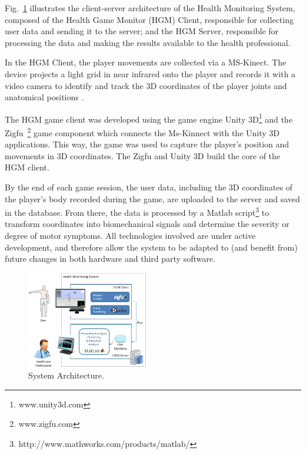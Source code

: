 \documentclass[10pt, conference, compsocconf]{IEEEtran}
\begin{document}

Fig.~\ref{img:sysarch} illustrates the client-server architecture of the Health Monitoring System, composed of the Health Game Monitor (HGM) Client, responsible for collecting user data and sending it to the server; and the HGM Server, responsible for processing the data and making the results available to the health professional.

In the HGM Client, the player movements are collected via a MS-Kinect. The device projects a light grid in near infrared onto the player and records it with a video camera to identify and track the 3D coordinates of the player joints and anatomical positions \cite{mcginnis2013biomechanics}. 

The HGM game client was developed using the game engine Unity 3D\footnote{www.unity3d.com} and the Zigfu~\footnote{www.zigfu.com} game component which connects the Ms-Kinnect with the Unity 3D applications. This way, the game was used to capture the player's position and movements in 3D coordinates. The Zigfu and Unity 3D build the core of the HGM client.

By the end of each game session, the user data, including the 3D coordinates of the player's body recorded during the game, are uploaded to the server and saved in the database. From there, the data is processed by a Matlab script\footnote
{http://www.mathworks.com/products/matlab/} to transform coordinates into biomechanical signals and determine the severity or degree of motor symptoms. All technologies involved are under active development, and therefore allow the system to be adapted to (and benefit from) future changes in both hardware and third party software. 

\begin{figure}[!htb]
	\centering
	\includegraphics[width=0.475\textwidth]{img/systemarchitecture3.png}
	\caption{System Architecture.}
	\label{img:sysarch}
\end{figure}
\end{document}

